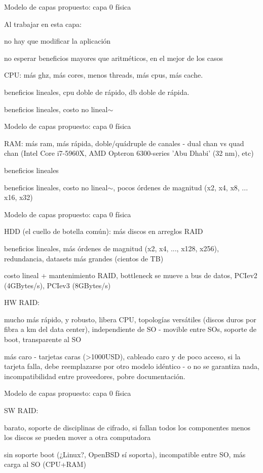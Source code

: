 \documentclass[11pt,spanish]{article}
\newcommand{\rowsp}[1][1em]{\vspace{#1}}
\newcommand{\hone}[1]{{\rowsp[0.3em]\noindent\Large #1 \rowsp[0.3em]}}
\newcommand{\mydesc}[1]{%
	\begin{description}
	\setlength\itemsep{0em}%
	#1
	\end{description}
}
\newcommand{\pros}{\item[pros:]}
\newcommand{\cons}{\item[cons:]}
\begin{document}
\newpage %
\hone{Modelo de capas propuesto: capa 0 física}

Al trabajar en esta capa:
\mydesc{\pros no hay que modificar la aplicación
	\cons no esperar beneficios mayores que aritméticos,
		en el mejor de los casos}

\mydesc{
	\item[CPU:] más ghz, más cores, menos threads, más cpus, más cache.
	\mydesc{
		\pros beneficios lineales, cpu doble de rápido, db doble de rápida.
		\cons beneficios lineales, costo no lineal$\sim$
	}
}

\newpage %
\hone{Modelo de capas propuesto: capa 0 física}
\mydesc{
	\item[RAM:] más ram, más rápida, doble/quádruple de canales - dual chan vs quad
			chan (Intel Core i7-5960X,
				AMD Opteron 6300-series 'Abu Dhabi' (32 nm), etc)
	\mydesc{
		\pros beneficios lineales
		\cons beneficios lineales, costo no lineal$\sim$, pocos
			órdenes de magnitud (x2, x4, x8, ... x16, x32)
	}
}


\newpage %
\hone{Modelo de capas propuesto: capa 0 física}

\mydesc{
	\item[HDD (el cuello de botella común):] más discos en arreglos RAID
	\mydesc{\pros beneficios lineales, más órdenes de magnitud
		(x2, x4, ..., x128, x256), redundancia, datasets más grandes
		(cientos de TB)
		\cons costo lineal + mantenimiento RAID, bottleneck se mueve a 
			bus de datos, PCIev2 (4GBytes/s), PCIev3 (8GBytes/s)
	}
	\item[HW RAID:]
		\mydesc{\pros mucho más rápido, y robusto, libera CPU,
		topologías versátiles (discos duros por fibra a km del data
		center), independiente de SO - movible entre SOs,
			soporte de boot, transparente al SO
			\cons más caro - tarjetas caras (>1000USD), cableado caro y de poco 
				acceso, si la tarjeta falla, debe reemplazarse 
				por otro modelo idéntico - o no se garantiza
				nada, incompatibilidad entre proveedores,
				pobre documentación.
		}

}
		
\newpage %
\hone{Modelo de capas propuesto: capa 0 física}
\mydesc{
	\item[SW RAID:]
		\mydesc{\pros barato, soporte de disciplinas de cifrado, 
				si fallan todos los componentes menos los discos
				se pueden mover a otra computadora
			\cons sin soporte boot (¿Linux?, OpenBSD sí soporta),
				incompatible entre SO, más carga al SO (CPU+RAM)
		}
}
\end{document}
